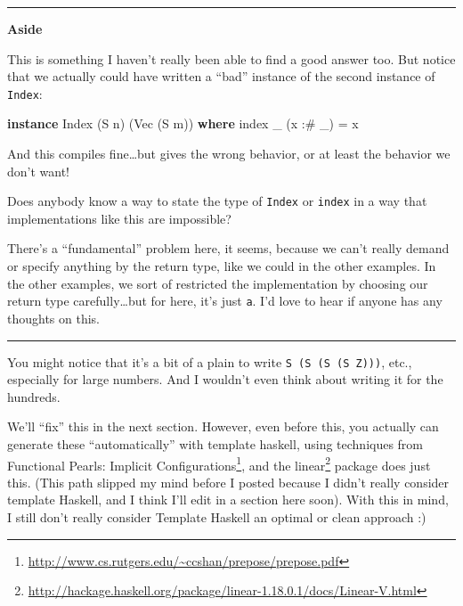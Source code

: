 \documentclass[]{article}
\newenvironment{Shaded}{}{}
\newcommand{\KeywordTok}[1]{\textcolor[rgb]{0.00,0.44,0.13}{\textbf{{#1}}}}
\newcommand{\DataTypeTok}[1]{\textcolor[rgb]{0.56,0.13,0.00}{{#1}}}
\newcommand{\FunctionTok}[1]{\textcolor[rgb]{0.02,0.16,0.49}{{#1}}}
\newcommand{\NormalTok}[1]{{#1}}
\renewcommand{\href}[2]{#2\footnote{\url{#1}}}
\begin{document}
\begin{center}\rule{0.5\linewidth}{\linethickness}\end{center}

\textbf{Aside}

This is something I haven't really been able to find a good answer too. But
notice that we actually could have written a ``bad'' instance of the second
instance of \texttt{Index}:

\begin{Shaded}
\begin{Highlighting}[]
\KeywordTok{instance} \DataTypeTok{Index} \NormalTok{(}\DataTypeTok{S} \NormalTok{n) (}\DataTypeTok{Vec} \NormalTok{(}\DataTypeTok{S} \NormalTok{m)) }\KeywordTok{where}
    \NormalTok{index _ (x }\FunctionTok{:#} \NormalTok{_) }\FunctionTok{=} \NormalTok{x}
\end{Highlighting}
\end{Shaded}

And this compiles fine\ldots{}but gives the wrong behavior, or at least the
behavior we don't want!

Does anybody know a way to state the type of \texttt{Index} or \texttt{index} in
a way that implementations like this are impossible?

There's a ``fundamental'' problem here, it seems, because we can't really demand
or specify anything by the return type, like we could in the other examples. In
the other examples, we sort of restricted the implementation by choosing our
return type carefully\ldots{}but for here, it's just \texttt{a}. I'd love to
hear if anyone has any thoughts on this.

\begin{center}\rule{0.5\linewidth}{\linethickness}\end{center}

You might notice that it's a bit of a plain to write
\texttt{S\ (S\ (S\ (S\ Z)))}, etc., especially for large numbers. And I wouldn't
even think about writing it for the hundreds.

We'll ``fix'' this in the next section. However, even before this, you actually
can generate these ``automatically'' with template haskell, using techniques
from \href{http://www.cs.rutgers.edu/~ccshan/prepose/prepose.pdf}{Functional
Pearls: Implicit Configurations}, and the
\href{http://hackage.haskell.org/package/linear-1.18.0.1/docs/Linear-V.html}{linear}
package does just this. (This path slipped my mind before I posted because I
didn't really consider template Haskell, and I think I'll edit in a section here
soon). With this in mind, I still don't really consider Template Haskell an
optimal or clean approach :)
\end{document}
